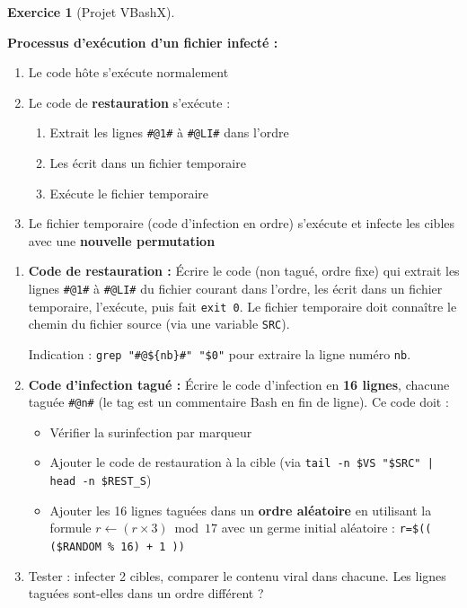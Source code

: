 \documentclass[a4paper,11pt]{article}
\theoremstyle{plain}
\theoremstyle{definition}
\newtheorem{exercice}{Exercice}
\begin{document}
\begin{exercice}[Projet VBashX]
\begin{rappel}
\medskip
\textbf{Processus d'exécution d'un fichier infecté :}
\begin{enumerate}
    \item Le code hôte s'exécute normalement
    \item Le code de \textbf{restauration} s'exécute :
    \begin{enumerate}
        \item Extrait les lignes \texttt{\#@1\#} à \texttt{\#@LI\#} dans l'ordre
        \item Les écrit dans un fichier temporaire
        \item Exécute le fichier temporaire
    \end{enumerate}
    \item Le fichier temporaire (code d'infection en ordre) s'exécute et infecte les cibles avec une \textbf{nouvelle permutation}
\end{enumerate}
\end{rappel}

\begin{enumerate}
\item[\textbf{4a)}] \textbf{Code de restauration :} Écrire le code (non tagué, ordre fixe) qui extrait les lignes \texttt{\#@1\#} à \texttt{\#@LI\#} du fichier courant dans l'ordre, les écrit dans un fichier temporaire, l'exécute, puis fait \texttt{exit 0}. Le fichier temporaire doit connaître le chemin du fichier source (via une variable \texttt{SRC}).

Indication : \texttt{grep "\#@\$\{nb\}\#" "\$0"} pour extraire la ligne numéro \texttt{nb}.

\item[\textbf{4b)}] \textbf{Code d'infection tagué :} Écrire le code d'infection en \textbf{16 lignes}, chacune taguée \texttt{\#@n\#} (le tag est un commentaire Bash en fin de ligne). Ce code doit :
\begin{itemize}
    \item Vérifier la surinfection par marqueur
    \item Ajouter le code de restauration à la cible (via \texttt{tail -n \$VS "\$SRC" | head -n \$REST\_S})
    \item Ajouter les 16 lignes taguées dans un \textbf{ordre aléatoire} en utilisant la formule $r \leftarrow (r \times 3) \bmod 17$ avec un germe initial aléatoire : \texttt{r=\$(( (\$RANDOM \% 16) + 1 ))}
\end{itemize}

\item[\textbf{4c)}] Tester : infecter 2 cibles, comparer le contenu viral dans chacune. Les lignes taguées sont-elles dans un ordre différent ?


\end{enumerate}
\end{exercice}
\end{document}

